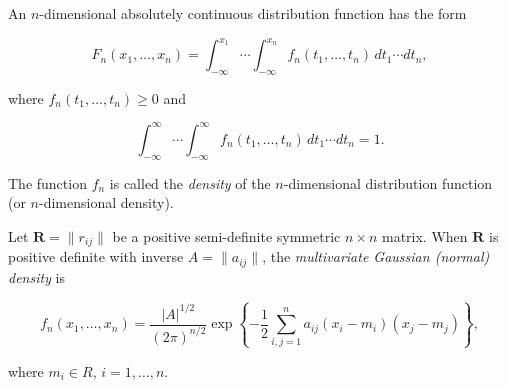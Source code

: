 An $n$-dimensional absolutely continuous distribution function has the form

$$F_n(x_1, \ldots, x_n) = \int_{-\infty}^{x_1} \cdots \int_{-\infty}^{x_n} f_n(t_1, \ldots, t_n)\,dt_1 \cdots dt_n,$$

where $f_n(t_1, \ldots, t_n) \geq 0$ and

$$\int_{-\infty}^{\infty} \cdots \int_{-\infty}^{\infty} f_n(t_1, \ldots, t_n)\,dt_1 \cdots dt_n = 1.$$

The function $f_n$ is called the \textit{density} of the $n$-dimensional distribution function (or $n$-dimensional density).

Let $\mathbf{R} = \|r_{ij}\|$ be a positive semi-definite symmetric $n \times n$ matrix. When $\mathbf{R}$ is positive definite with inverse $A = \|a_{ij}\|$, the \textit{multivariate Gaussian (normal) density} is

$$f_n(x_1, \ldots, x_n) = \frac{|A|^{1/2}}{(2\pi)^{n/2}} \exp\left\{-\frac{1}{2} \sum_{i,j=1}^{n} a_{ij} (x_i - m_i)(x_j - m_j)\right\},$$

where $m_i \in R$, $i = 1, \ldots, n$.
